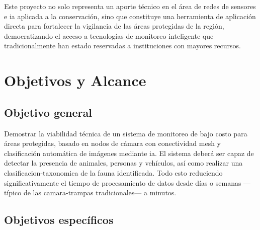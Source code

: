 \documentclass[a4paper, 12pt]{report}
\begin{document}
Este proyecto no solo representa un aporte técnico en el área de redes de
sensores e \gls{ia} aplicada a la conservación, sino que constituye una
herramienta de aplicación directa para fortalecer la vigilancia de las áreas
protegidas de la región, democratizando el acceso a tecnologías de monitoreo
inteligente que tradicionalmente han estado reservadas a instituciones con
mayores recursos.

\chapter{Objetivos y Alcance}

\section{Objetivo general}

Demostrar la viabilidad técnica de un sistema de monitoreo de bajo costo para
áreas protegidas, basado en nodos de cámara con conectividad \gls{mesh} y
clasificación automática de imágenes mediante \gls{ia}. El sistema deberá ser
capaz de detectar la presencia de animales, personas y vehículos, así como
realizar una \gls{clasificacion-taxonomica} de la fauna identificada. Todo esto
reduciendo significativamente el tiempo de procesamiento de datos desde días o
semanas ---típico de las \glspl{camara-trampa} tradicionales--- a minutos.

\section{Objetivos específicos}
\end{document}
